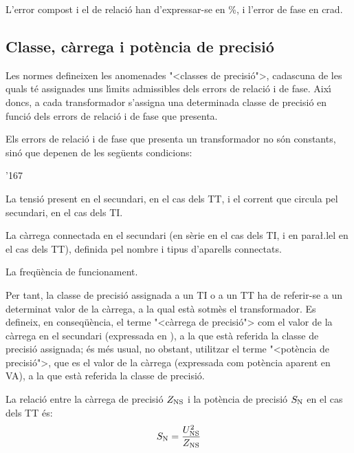 L'error compost i el de relaci\'{o} han d'expressar-se en \%, i l'error
de fase en crad.

\subsection{Classe, c\`{a}rrega i pot\`{e}ncia de precisi\'{o}}

Les normes defineixen les anomenades {"<}classes de precisi\'{o}{">},
cadascuna de les quals t\'{e} assignades uns l\'{\i}mits admissibles dels
errors de relaci\'{o} i de fase. Aix\'{\i} doncs, a cada transformador
s'assigna una determinada classe de precisi\'{o} en funci\'{o} dels errors
de relaci\'{o} i de fase que presenta.

Els errors de relaci\'{o} i de fase que presenta un transformador no s\'{o}n
constants, sin\'{o} que depenen de les seg\"{u}ents condicions:
\begin{dinglist}{'167}
   \item La tensi\'{o} present en el secundari, en el cas dels TT, i el corrent que
   circula    pel secundari, en el cas dels TI.
   \item La c\`{a}rrega connectada en el secundari (en s\`{e}rie en el cas dels TI,
   i en para{\l.l}el en el cas dels TT), definida pel nombre i tipus d'aparells connectats.
   \item La freq\"{u}\`{e}ncia de funcionament.
\end{dinglist}

Per tant, la classe de precisi\'{o} assignada a un TI o a un TT ha de
referir-se a un determinat valor de la c\`{a}rrega, a la qual est\`{a}
sotm\`{e}s el transformador. Es defineix, en conseq\"{u}\`{e}ncia, el terme
{"<}c\`{a}rrega de precisi\'{o}{">} com el valor de la c\`{a}rrega en el secundari
(expressada en \ohm), a la que est\`{a} referida la classe de precisi\'{o}
assignada; \'{e}s m\'{e}s usual, no obstant,  utilitzar el terme {"<}pot\`{e}ncia
de precisi\'{o}{">}, que es el valor de la c\`{a}rrega (expressada com pot\`{e}ncia
aparent en VA),
 a la que est\`{a} referida la classe de precisi\'{o}.

La relaci\'{o} entre la c\`{a}rrega de precisi\'{o} $Z_\mathrm{NS}$ i la pot\`{e}ncia de
precisi\'{o} $S_\mathrm{N}$ en el cas dels TT \'{e}s:
\begin{equation}
    S_\mathrm{N} = \frac{U_\mathrm{NS}^2}{Z_\mathrm{NS}}
\end{equation}

